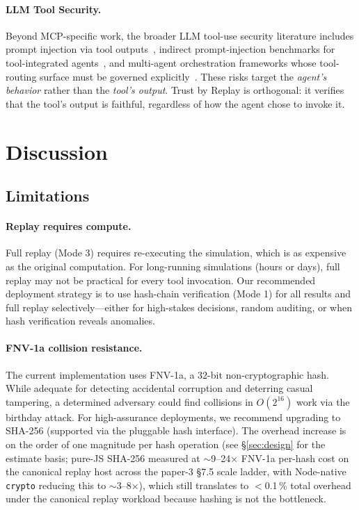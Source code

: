 \documentclass[letterpaper,twocolumn,10pt]{article}
\providecommand{\measuredFrom}[1]{}
\begin{document}
\paragraph{LLM Tool Security.} Beyond MCP-specific work, the broader LLM
tool-use security literature includes prompt injection via tool
outputs~\cite{greshake2023}, indirect prompt-injection benchmarks for
tool-integrated agents~\cite{zhan2024}, and multi-agent orchestration
frameworks whose tool-routing surface must be governed explicitly~\cite{wu2024}.
These risks target the \emph{agent's behavior} rather than the \emph{tool's
output}. Trust by Replay is orthogonal: it verifies that the tool's output is
faithful, regardless of how the agent chose to invoke it.


\section{Discussion}
\label{sec:discussion}

\subsection{Limitations}

\paragraph{Replay requires compute.} Full replay (Mode 3) requires
re-executing the simulation, which is as expensive as the original
computation. For long-running simulations (hours or days), full replay may
not be practical for every tool invocation. Our recommended deployment
strategy is to use hash-chain verification (Mode 1) for all results and
full replay selectively---either for high-stakes decisions, random auditing,
or when hash verification reveals anomalies.

\paragraph{FNV-1a collision resistance.} The current implementation uses
FNV-1a, a 32-bit non-cryptographic hash. While adequate for detecting
accidental corruption and deterring casual tampering, a determined adversary
could find collisions in $O(2^{16})$ work via the birthday attack. For
high-assurance deployments, we recommend upgrading to SHA-256 (supported via
the pluggable hash interface). The overhead increase is on the order of
one magnitude per hash operation (see \S\ref{sec:design} for the
estimate basis; pure-JS SHA-256 measured at $\sim$9--24$\times$ FNV-1a
per-hash cost on the canonical replay host across the paper-3 \S7.5
scale ladder, with Node-native \texttt{crypto} reducing this to
$\sim$3--8$\times$),
\measuredFrom{HoloScript/packages/engine/src/simulation/__tests__/fnv1a-vs-sha256.bench.test.ts}%
which still translates to $<$0.1\,\% total overhead under the canonical
replay workload because hashing is not the bottleneck.
\end{document}
